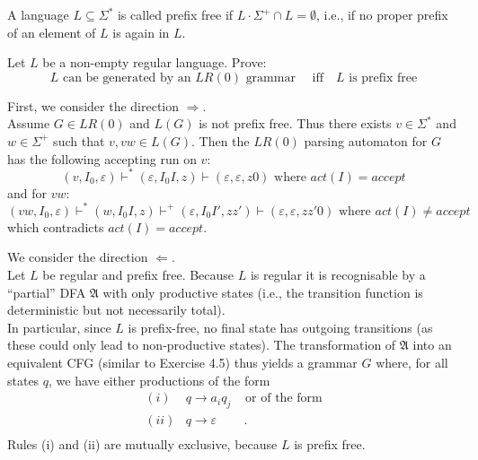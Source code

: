 \begin{exercise}{30}
\begin{mydef}
A language $L \subseteq \Sigma^{*}$ is called prefix free if $L \cdot \Sigma^{+} \cap L = \emptyset$, i.e., if no proper prefix of an
element of $L$ is again in $L$.
\end{mydef}

Let $L$ be a non-empty regular language. Prove:
$$L \text{ can be generated by an } LR(0) \text{ grammar } \quad  \text{iff} \quad L \text{ is prefix free}$$
\end{exercise}

\begin{solution}
First, we consider the direction $\Rightarrow$.\\
Assume $G\in LR(0)$ and $L(G)$ is not prefix free. Thus there exists $v \in \Sigma^{*}$ and $w \in \Sigma^{+}$ such that $v, vw \in L(G)$. Then the $LR(0)$ parsing automaton for $G$ has the following accepting run on $v$:
\[ (v, I_0, \varepsilon) \vdash^{*} (\varepsilon, I_0 I, z) \vdash (\varepsilon, \varepsilon, z0) \text{ where } act(I) = accept\]
and for $vw$:
\[ (vw, I_0, \varepsilon) \vdash^{*} (w, I_0 I, z) \vdash^{+} (\varepsilon, I_0 I', zz') \vdash (\varepsilon, \varepsilon, zz'0) \text{ where } act(I) \neq accept\]
which contradicts $act(I)=accept$.\par

We consider the direction $\Leftarrow$.\\
Let $L$ be regular and prefix free.
Because $L$ is regular it is recognisable by a ``partial'' DFA $\mathfrak{A}$ with only productive states (i.e., the transition function is deterministic but not necessarily total).\\
In particular, since $L$ is prefix-free, no final state has outgoing transitions (as these could only lead to non-productive states).
The transformation of $\mathfrak{A}$ into an equivalent CFG (similar to Exercise 4.5)
thus yields a grammar $G$ where, for all states $q$, we have either productions of the form
\[
\begin{array}{lll}
    (i)  & q \to a_i q_j& \text{ or of the form} \\
    (ii) & q \to \varepsilon  & ~.\\
\end{array}
\]
Rules (i) and (ii) are mutually exclusive, because $L$ is prefix free.


\end{solution}
